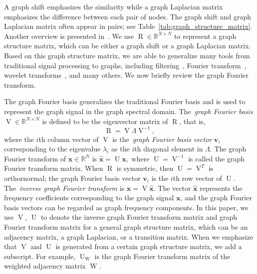 \documentclass[journal,twocolumn,10pt]{IEEEtran}
\theoremstyle{definition}
\newcommand{\R}{\ensuremath{\mathbb{R}}}
\def\x{\mathbf{x}}
\def\vv{\mathbf{v}}
\DeclareMathOperator{\RR}{R}
\DeclareMathOperator{\Vm}{V}
\DeclareMathOperator{\Um}{U}
\DeclareMathOperator{\W}{W}
\begin{document}
A graph shift emphasizes the similarity while a graph Laplacian matrix emphasizes the difference between each pair of nodes. The graph shift and graph Laplacian matrix often appear in pairs; see Table~\ref{tab:graph_structure_matrix}. Another overview is presented in~\cite{AnisAO:15}. We use $\RR \in \R^{N \times N}$ to represent a graph structure matrix, which can be either a graph shift or a graph Laplacian matrix.  Based on this graph structure matrix, we are able to generalize many tools from traditional signal processing to graphs, including filtering~\cite{NarangO:12, ChenCRBGK:13}, Fourier transform~\cite{ShumanNFOV:13, SandryhailaM:13}, wavelet transforms~\cite{CrovellaK:03,HammondVG:11}, and many others.  We now briefly review the graph Fourier transform.

The graph Fourier basis generalizes the traditional Fourier basis and is used to represent the graph signal in the graph spectral domain.  The~\textit{graph Fourier basis} $\Vm \in \R^{N \times N}$ is defined to be the eigenvector matrix of $\RR$, that is,
\begin{equation*}
	\RR =  \Vm \Lambda \Vm^{-1},
\end{equation*}
where the $i$th column vector of $\Vm$ is the~\textit{graph Fourier basis vector} $\vv_i$ corresponding to the eigenvalue $\lambda_i$ as the $i$th diagonal element in $\Lambda$. The graph Fourier transform \rm{of $\x \in \mathbb{R}^N$} is 
$
	\widehat{\x} = \Um \x,
$
where $\Um = \Vm^{-1}$ is called the graph Fourier transform matrix. 
When $\RR$ is symmetric, then $\Um = \Vm^T$ is orthornormal; the graph Fourier basis vector $\vv_i$ is the $i$th row vector of $\Um$. The~\textit{inverse graph Fourier transform} is
$
	\x =  \Vm  \widehat{\x}.
$
The vector $\widehat{\x}$ represents the frequency coefficients corresponding to the graph signal $\x$, and the graph Fourier basis vectors can be regarded as graph frequency components. In this paper, we use $\Vm$, $\Um$ to denote the inverse graph Fourier transform matrix and graph Fourier transform matrix for a general graph structure matrix, which can be an adjacency matrix, a graph Laplacian, or a transition matrix. When we emphasize that $\Vm$ and $\Um$ is generated from a certain graph structure matrix, we add a subscript. For example, $\Um_{\W}$ is the graph Fourier transform matrix of the weighted adjacency matrix $\W$.
\end{document}
